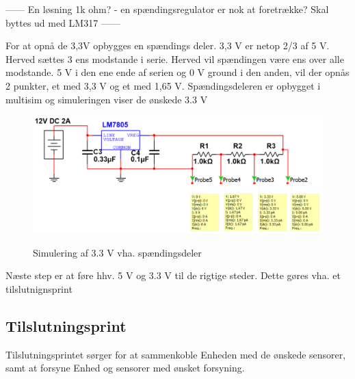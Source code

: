 ------
En løsning 1k ohm?  - en spændingsregulator er nok at foretrække?
Skal byttes ud med LM317
------

For at opnå de 3,3V opbygges en spændings deler. 3,3 V er netop 2/3 af 5 V. Herved sættes 3 ens modstande i serie. Herved vil spændingen være ens over alle modstande. 5 V i den ene ende af serien og 0 V ground i den anden, vil der opnås 2 punkter, et med 3,3 V og et med 1,65 V. Spændingsdeleren er opbygget i multisim og simuleringen viser de ønskede 3.3 V

 
\begin{figure}[H] \centering
{\includegraphics[width=\textwidth]{filer/design/Billeder/33V_SIMULATION}}
\caption{Simulering af 3.3 V vha. spændingsdeler}
\label{lab:3.3V_SIMULERING}
\raggedright
\end{figure}

Næste step er at føre hhv. 5 V og 3.3 V til de rigtige steder. Dette gøres vha. et tilslutnignsprint

\subsection{Tilslutningsprint}

Tilslutningsprintet sørger for at sammenkoble Enheden med de ønskede sensorer, samt at forsyne Enhed og sensorer med ønsket forsyning.